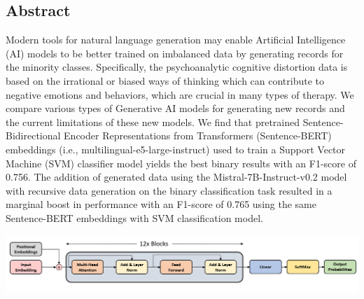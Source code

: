 \documentclass[a0,landscape]{a0poster}
\begin{document}
\begin{multicols}{4} %



\color{Teal}
\section*{Abstract}
\color{black} 
Modern tools for natural language generation may enable Artificial Intelligence (AI) models to be better trained on imbalanced data by generating records for the minority classes. Specifically, the psychoanalytic cognitive distortion data is based on the irrational or biased ways of thinking which can contribute to negative emotions and behaviors, which are crucial in many types of therapy. We compare various types of Generative AI models for generating new records and the current limitations of these new models. We find that pretrained Sentence-Bidirectional Encoder Representations from Transformers (Sentence-BERT) embeddings (i.e., multilingual-e5-large-instruct) used to train a Support Vector Machine (SVM) classifier model yields the best binary results with an F1-score of 0.756. The addition of generated data using the Mistral-7B-Instruct-v0.2 model with recursive data generation on the binary classification task resulted in a marginal boost in performance with an F1-score of 0.765 using the same Sentence-BERT embeddings with SVM classification model.




\color{Teal} %




\color{Black}

\begin{center}\vspace{0.5cm}
\includegraphics[width=0.99\linewidth]{GPT_1.png}
\end{center}\vspace{0.5cm}


\end{multicols}
\end{document}
